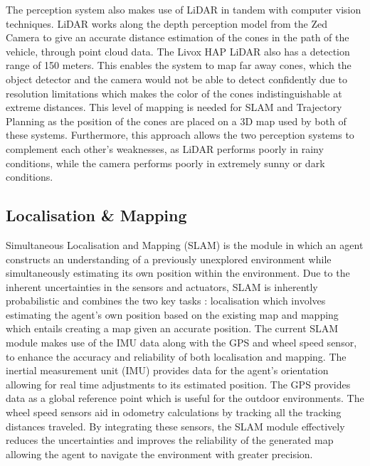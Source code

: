 \documentclass[a4paper,11pt]{report}
\begin{document}
The perception system also makes use of LiDAR in tandem with computer vision techniques. LiDAR works along the depth perception model from the Zed Camera to give an accurate distance estimation of the cones in the path of the vehicle, through point cloud data. The Livox HAP LiDAR also has a detection range of 150 meters. This enables the system to map far away cones, which the object detector and the camera would not be able to detect confidently due to resolution limitations which makes the color of the cones indistinguishable at extreme distances. This level of mapping is needed for SLAM and Trajectory Planning as the position of the cones are placed on a 3D map used by both of these systems. Furthermore, this approach allows the two perception systems to complement each other’s weaknesses, as LiDAR performs poorly in rainy conditions, while the camera performs poorly in extremely sunny or dark conditions.

\subsection{Localisation \& Mapping}

Simultaneous Localisation and Mapping (SLAM) is the module in which an agent constructs an understanding of a previously unexplored environment while simultaneously estimating its own position within the environment. Due to the inherent uncertainties in the sensors and actuators, SLAM is inherently probabilistic and combines the two key tasks : localisation which involves estimating the agent's own position based on the existing map and mapping which entails creating a map given an accurate position. The current SLAM module makes use of the IMU data along with the GPS and wheel speed sensor, to enhance the accuracy and reliability of both localisation and mapping. The inertial measurement unit (IMU) provides data for the agent’s orientation allowing for real time adjustments to its estimated position. The GPS provides data as a global reference point which is useful for the outdoor environments. The wheel speed sensors aid in odometry calculations by tracking all the tracking distances traveled. By integrating these sensors, the SLAM module effectively reduces the uncertainties and improves the reliability of the generated map allowing the agent to navigate the environment with greater precision.
\end{document}
